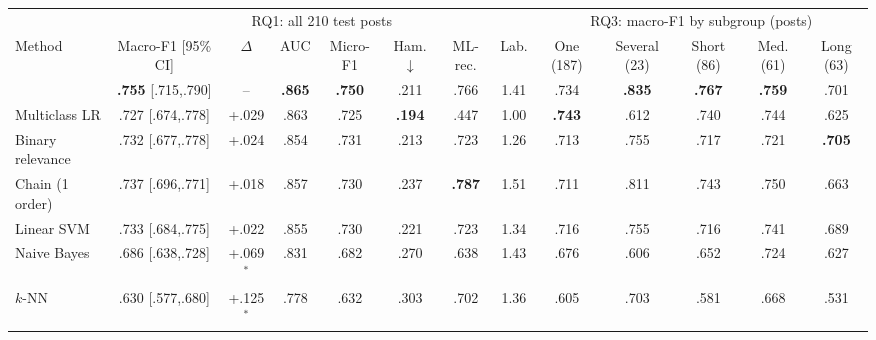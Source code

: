 \begin{tabular}{@{}l@{\hspace{4pt}}cccccccccccc@{}}
\toprule
& \multicolumn{7}{c}{RQ1: all 210 test posts} & \multicolumn{5}{c}{RQ3: macro-F1 by subgroup (posts)} \\
\cmidrule(lr){2-8}\cmidrule(l){9-13}
Method & Macro-F1 [95\% CI] & $\Delta$ & AUC & Micro-F1 & Ham.$\downarrow$ & ML-rec. & Lab. & One {\scriptsize(187)} & Several {\scriptsize(23)} & Short {\scriptsize(86)} & Med. {\scriptsize(61)} & Long {\scriptsize(63)} \\
\midrule
\core{} & \textbf{.755} {\scriptsize[.715,.790]} & -- & \textbf{.865} & \textbf{.750} & .211 & .766 & 1.41 & .734 & \textbf{.835} & \textbf{.767} & \textbf{.759} & .701 \\
Multiclass LR & .727 {\scriptsize[.674,.778]} & +.029 & .863 & .725 & \textbf{.194} & .447 & 1.00 & \textbf{.743} & .612 & .740 & .744 & .625 \\
Binary relevance & .732 {\scriptsize[.677,.778]} & +.024 & .854 & .731 & .213 & .723 & 1.26 & .713 & .755 & .717 & .721 & \textbf{.705} \\
Chain (1 order) & .737 {\scriptsize[.696,.771]} & +.018 & .857 & .730 & .237 & \textbf{.787} & 1.51 & .711 & .811 & .743 & .750 & .663 \\
Linear SVM & .733 {\scriptsize[.684,.775]} & +.022 & .855 & .730 & .221 & .723 & 1.34 & .716 & .755 & .716 & .741 & .689 \\
Naive Bayes & .686 {\scriptsize[.638,.728]} & +.069$^\ast$ & .831 & .682 & .270 & .638 & 1.43 & .676 & .606 & .652 & .724 & .627 \\
$k$-NN & .630 {\scriptsize[.577,.680]} & +.125$^\ast$ & .778 & .632 & .303 & .702 & 1.36 & .605 & .703 & .581 & .668 & .531 \\
\bottomrule
\end{tabular}
